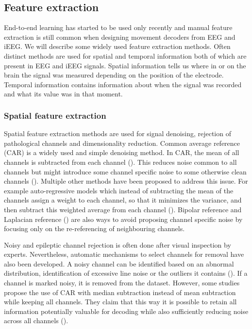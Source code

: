 \subsection{Feature extraction}
End-to-end learning has started to be used only recently and manual feature extraction is still common when designing movement decoders from EEG and iEEG.
We will describe some widely used feature extraction methods. 
Often distinct methods are used for spatial and temporal information both of which are present in EEG and iEEG signals. 
Spatial information tells us where in or on the brain the signal was measured depending on the position of the electrode.
Temporal information contains information about when the signal was recorded and what its value was in that moment.
\subsubsection{Spatial feature extraction}
Spatial feature extraction methods are used for signal denoising, rejection of pathological channels and dimensionality reduction.
 Common average reference (CAR) is a widely used and simple denoising method.
 In CAR, the mean of all channels is subtracted from each channel (\cite{liu-effects-2015}).
 This reduces noise common to all channels but might introduce some channel specific noise to some otherwise clean channels (\cite{volkova-review}). 
 Multiple other methods have been proposed to address this issue.
 For example auto-regressive models which instead of subtracting the mean of the channels assign a weight to each channel, so that it minimizes the variance, and then subtract this weighted average from each channel (\cite{adaptive-laplacian-reference}).
 Bipolar reference and Laplacian reference (\cite{yao2019reference, laplacian-reference}) are also ways to avoid proposing channel specific noise by focusing only on the re-referencing of neighbouring channels.
 
 
Noisy and epileptic channel rejection is often done after visual inspection by experts. Nevertheless, automatic mechanisms to select channels for removal have also been developed. A noisy channel can be identified based on an abnormal distribution, identification of excessive line noise or the outliers it contains (\cite{liu-effects-2015}). If a channel is marked noisy, it is removed from the dataset. However, some studies propose the use of CAR with median subtraction instead of mean subtraction while keeping all channels. They claim that this way it is possible to retain all information potentially valuable for decoding while also sufficiently reducing noise across all channels (\cite{liu-effects-2015}). 


